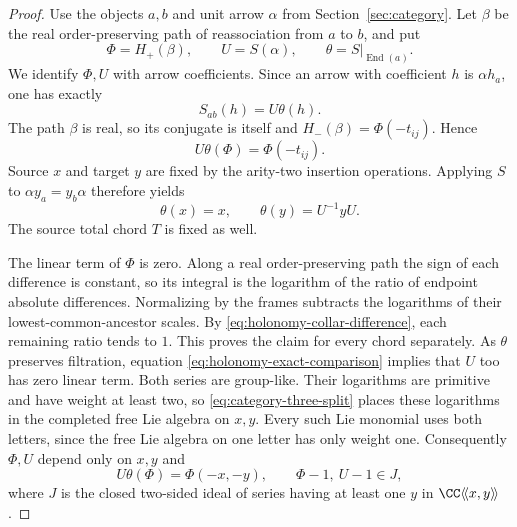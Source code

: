 \begin{proof}
Use the objects $a,b$ and unit arrow $\alpha$ from
Section~\ref{sec:category}.  Let $\beta$ be the real order-preserving
path of reassociation from $a$ to $b$, and put
\[
 \Phi=H_+(\beta),\qquad U=S(\alpha),\qquad
 \theta=S|_{\operatorname{End}(a)}.
\]
We identify $\Phi,U$ with arrow coefficients.  Since an arrow with
coefficient $h$ is $\alpha h_a$, one has exactly
\begin{equation}\label{eq:holonomy-arrow-action}
 S_{ab}(h)=U\theta(h).
\end{equation}
The path $\beta$ is real, so its conjugate is itself and
$H_-(\beta)=\Phi(-t_{ij})$.  Hence
\begin{equation}\label{eq:holonomy-exact-comparison}
 U\theta(\Phi)=\Phi(-t_{ij}).
\end{equation}
Source $x$ and target $y$ are fixed by the arity-two insertion
operations.  Applying $S$ to $\alpha y_a=y_b\alpha$ therefore yields
\begin{equation}\label{eq:holonomy-source-action}
 \theta(x)=x,\qquad \theta(y)=U^{-1}yU.
\end{equation}
The source total chord $T$ is fixed as well.

The linear term of $\Phi$ is zero.  Along a real order-preserving
path the sign of each difference is constant, so its integral is the
logarithm of the ratio of endpoint absolute differences.  Normalizing
by the frames subtracts the logarithms of their lowest-common-ancestor
scales.  By \eqref{eq:holonomy-collar-difference}, each remaining
ratio tends to $1$.  This proves the claim for every chord separately.
As $\theta$ preserves filtration, equation
\eqref{eq:holonomy-exact-comparison} implies that $U$ too has zero
linear term.  Both series are group-like.  Their logarithms are
primitive and have weight at least two, so
\eqref{eq:category-three-split} places these logarithms in the
completed free Lie algebra on $x,y$.  Every such Lie monomial uses
both letters, since the free Lie algebra on one letter has only
weight one.  Consequently $\Phi,U$ depend only on $x,y$ and
\begin{equation}\label{eq:holonomy-exact-xy}
 U\theta(\Phi)=\Phi(-x,-y),\qquad
 \Phi-1,\ U-1\in J,
\end{equation}
where $J$ is the closed two-sided ideal of series having at least one
$y$ in $\CC\langle\!\langle x,y\rangle\!\rangle$.


\end{proof}
